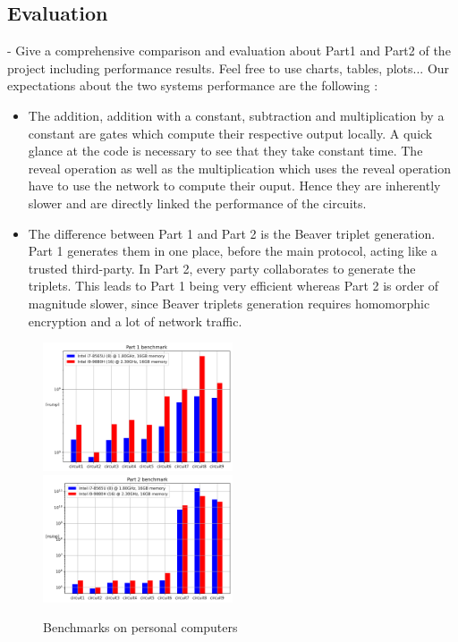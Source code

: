 \documentclass[10pt,conference]{IEEEtran}
\begin{document}
\begin{itemize}
\section{Evaluation}
- Give a comprehensive comparison and evaluation about Part1 and Part2 of the project including performance results. Feel free to use charts, tables, plots...
Our expectations about the two systems performance are the following :
\begin{itemize}
    \item The addition, addition with a constant, subtraction and multiplication by a constant are gates which compute their respective output locally. A quick glance at the code is necessary to see that they take constant time. The reveal operation as well as the multiplication which uses the reveal operation have to use the network to compute their ouput. Hence they are inherently slower and are directly linked the performance of the circuits.
    \item The difference between Part 1 and Part 2 is the Beaver triplet generation. Part 1 generates them in one place, before the main protocol, acting like a trusted third-party. In Part 2, every party collaborates to generate the triplets. This leads to Part 1 being very efficient whereas Part 2 is order of magnitude slower, since Beaver triplets generation requires homomorphic encryption and a lot of network traffic. %
\end{itemize}

\begin{figure}[h]
  \caption{Benchmarks on personal computers}
  \label{fig:bench}
  \includegraphics[width=0.5\textwidth]{Part_1_benchmark.png}
  \includegraphics[width=0.5\textwidth]{Part_2_benchmark.png}
\end{figure}


\end{itemize}
\end{document}
